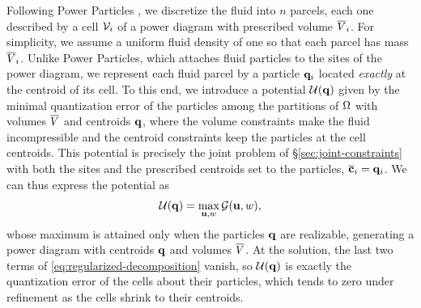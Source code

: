 \documentclass[main.tex]{subfiles}
\begin{document}
Following Power Particles \cite{deGoes2015PowerParticles}, we discretize the fluid into $n$ parcels, each one described by a cell $\mathcal{V}_i$ of a power diagram with prescribed volume $\overline{V}_i$.
For simplicity, we assume a uniform fluid density of one so that each parcel has mass $\overline{V}_i$.
Unlike Power Particles, which attaches fluid particles to the sites of the power diagram, we represent each fluid parcel by a particle $\mathbf{q}_i$ located \emph{exactly} at the centroid of its cell.
To this end, we introduce a potential $\mathcal{U}(\mathbf{q})$ given by the minimal quantization error of the particles among the partitions of $\Omega$ with volumes $\overline{V}$ and centroids $\mathbf{q}$, where the volume constraints make the fluid incompressible and the centroid constraints keep the particles at the cell centroids.
This potential is precisely the joint problem of \S\ref{sec:joint-constraints} with both the sites and the prescribed centroids set to the particles, \ie $\overline{\mathbf{c}}_i = \mathbf{q}_i$.
We can thus express the potential as
\begin{equation}
  \mathcal{U}(\mathbf{q}) = \max_{\mathbf{u}, w} \mathcal{G}(\mathbf{u}, w) ,
  \label{eq:flow-centroid-potential}
\end{equation}
whose maximum is attained only when the particles $\mathbf{q}$ are realizable, generating a power diagram with centroids $\mathbf{q}$ and volumes $\overline{V}$.
At the solution, the last two terms of \eqref{eq:regularized-decomposition} vanish, so $\mathcal{U}(\mathbf{q})$ is exactly the quantization error of the cells about their particles, which tends to zero under refinement as the cells shrink to their centroids.
\end{document}
